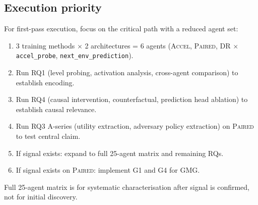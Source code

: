 \documentclass[11pt,a4paper]{article}
\theoremstyle{remark}
\newcommand{\paired}{\textsc{Paired}}
\newcommand{\accel}{\textsc{Accel}}
\newcommand{\dr}{\textsc{DR}}
\begin{document}
\subsection*{Execution priority}
For first-pass execution, focus on the critical path with a reduced agent set:
\begin{enumerate}[nosep]
    \item 3 training methods $\times$ 2 architectures = 6 agents (\accel{}, \paired{}, \dr{} $\times$ \texttt{accel\_probe}, \texttt{next\_env\_prediction}).
    \item Run RQ1 (level probing, activation analysis, cross-agent comparison) to establish encoding.
    \item Run RQ4 (causal intervention, counterfactual, prediction head ablation) to establish causal relevance.
    \item Run RQ3 A-series (utility extraction, adversary policy extraction) on \paired{} to test central claim.
    \item If signal exists: expand to full 25-agent matrix and remaining RQs.
    \item If signal exists on \paired{}: implement G1 and G4 for GMG.
\end{enumerate}
Full 25-agent matrix is for systematic characterisation after signal is confirmed, not for initial discovery.
\end{document}
